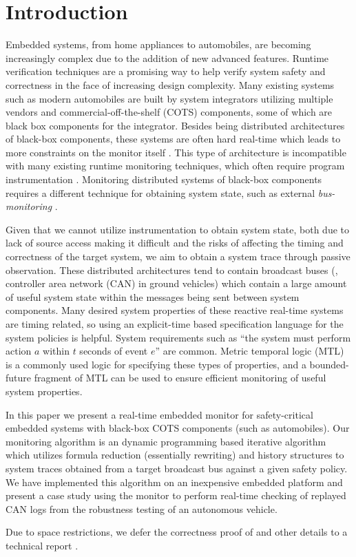 
\section{Introduction}
Embedded systems, from home appliances to automobiles, are becoming increasingly complex due to the addition of new advanced features. 
Runtime verification techniques are a promising way to help verify system safety and correctness in the face of increasing design complexity.
Many existing systems such as modern automobiles are built by system integrators utilizing multiple vendors and commercial-off-the-shelf (COTS) components, some of which are black box components for the integrator. Besides being distributed architectures of black-box components, these systems are often hard real-time which leads to more constraints on the monitor itself \cite{Goodloe2010}.
%
This type of architecture is incompatible with many existing runtime monitoring techniques, which often require program instrumentation \cite{}. Monitoring distributed systems of black-box components requires a different technique for obtaining system state, such as external \emph{bus-monitoring} \cite{Goodloe2010}.

Given that we cannot utilize instrumentation to obtain system state, both due to lack of source access making it difficult and the risks of affecting the timing and correctness of the target system, we aim to obtain a system trace through passive observation. These distributed architectures tend to contain broadcast buses (\eg, controller area network (CAN) in ground vehicles) which contain a large amount of useful system state within the messages being sent between system components. 
Many desired system properties of these reactive real-time systems are timing related, so using an explicit-time based specification language for the system policies is helpful. 
System requirements such as ``{the system must perform action $a$ within $t$ seconds of event $e$}'' are common.
Metric temporal logic (MTL) is a commonly used logic for specifying these types of properties, and a bounded-future fragment of MTL can be used to ensure efficient monitoring of useful system properties.

In this paper we present a real-time embedded monitor for safety-critical embedded systems with black-box COTS components (such as automobiles). Our monitoring algorithm \monitor is an dynamic programming based iterative algorithm which utilizes formula reduction (essentially rewriting) and history structures to system traces obtained from a target broadcast bus against a given safety policy. We have implemented this algorithm on an inexpensive embedded platform and present a case study using the monitor to perform real-time checking of replayed CAN logs from the robustness testing of an autonomous vehicle.

Due to space restrictions, we defer the correctness proof of \monitor and other details to a technical report \cite{TechReport}.


